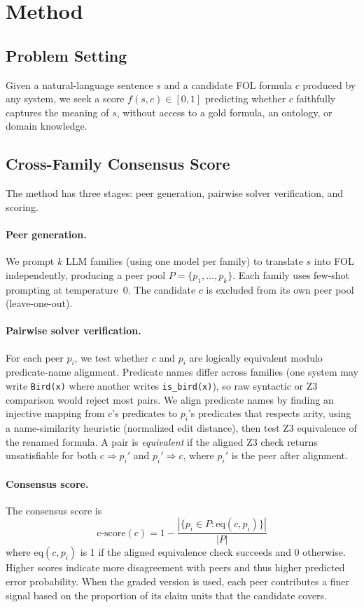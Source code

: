 \documentclass[11pt,letterpaper]{article}
\begin{document}
\section{Method}
\label{sec:method}

\subsection{Problem Setting}

Given a natural-language sentence $s$ and a candidate FOL formula $c$ produced by any system, we seek a score $f(s, c) \in [0, 1]$ predicting whether $c$ faithfully captures the meaning of $s$, without access to a gold formula, an ontology, or domain knowledge.

\subsection{Cross-Family Consensus Score}

The method has three stages: peer generation, pairwise solver verification, and scoring.

\paragraph{Peer generation.}
We prompt $k$ LLM families (using one model per family) to translate $s$ into FOL independently, producing a peer pool $P = \{p_1, \ldots, p_k\}$. Each family uses few-shot prompting at temperature~0. The candidate $c$ is excluded from its own peer pool (leave-one-out).

\paragraph{Pairwise solver verification.}
For each peer $p_i$, we test whether $c$ and $p_i$ are logically equivalent modulo predicate-name alignment. Predicate names differ across families (one system may write \texttt{Bird(x)} where another writes \texttt{is\_bird(x)}), so raw syntactic or Z3 comparison would reject most pairs. We align predicate names by finding an injective mapping from $c$'s predicates to $p_i$'s predicates that respects arity, using a name-similarity heuristic (normalized edit distance), then test Z3 equivalence of the renamed formula. A pair is \emph{equivalent} if the aligned Z3 check returns unsatisfiable for both $c \Rightarrow p_i'$ and $p_i' \Rightarrow c$, where $p_i'$ is the peer after alignment.

\paragraph{Consensus score.}
The consensus score is
\begin{equation}
\text{c-score}(c) = 1 - \frac{|\{p_i \in P : \text{eq}(c, p_i)\}|}{|P|}
\end{equation}
where $\text{eq}(c, p_i)$ is 1 if the aligned equivalence check succeeds and 0 otherwise. Higher scores indicate more disagreement with peers and thus higher predicted error probability. When the graded version is used, each peer contributes a finer signal based on the proportion of its claim units that the candidate covers.
\end{document}
